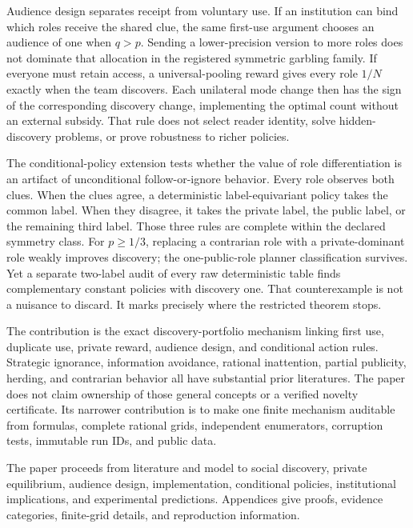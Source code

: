 \documentclass[11pt]{article}
\begin{document}
Audience design separates receipt from voluntary use. If an institution can
bind which roles receive the shared clue, the same first-use argument chooses
an audience of one when $q>p$. Sending a lower-precision version to more roles
does not dominate that allocation in the registered symmetric garbling family.
If everyone must retain access, a universal-pooling reward gives every role
$1/N$ exactly when the team discovers. Each unilateral mode change then has
the sign of the corresponding discovery change, implementing the optimal count
without an external subsidy. That rule does not select reader identity, solve
hidden-discovery problems, or prove robustness to richer policies.

The conditional-policy extension tests whether the value of role differentiation
is an artifact of unconditional follow-or-ignore behavior. Every role observes
both clues. When the clues agree, a deterministic label-equivariant policy takes
the common label. When they disagree, it takes the private label, the public
label, or the remaining third label. Those three rules are complete within the
declared symmetry class. For $p\geq1/3$, replacing a contrarian role with a
private-dominant role weakly improves discovery; the one-public-role planner
classification survives. Yet a separate two-label audit of every raw
deterministic table finds complementary constant policies with discovery one.
That counterexample is not a nuisance to discard. It marks precisely where the
restricted theorem stops.

The contribution is the exact discovery-portfolio mechanism linking first use,
duplicate use, private reward, audience design, and conditional action rules.
Strategic ignorance, information avoidance, rational inattention, partial
publicity, herding, and contrarian behavior all have substantial prior
literatures. The paper does not claim ownership of those general concepts or a
verified novelty certificate. Its narrower contribution is to make one finite
mechanism auditable from formulas, complete rational grids, independent
enumerators, corruption tests, immutable run IDs, and public data.

The paper proceeds from literature and model to social discovery, private
equilibrium, audience design, implementation, conditional policies,
institutional implications, and experimental predictions. Appendices give
proofs, evidence categories, finite-grid details, and reproduction information.


\end{document}
